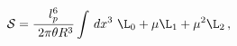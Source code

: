 \begin{equation}
{\cal S}=\displaystyle{\frac{l_{p}^{6}}{~2\pi\theta R^{3}} \int\,dx^{3}}~
 \L_{0}+\mu\L_{1}+\mu^{2}\L_{2}\,, \label{ncM2action}
\end{equation}

